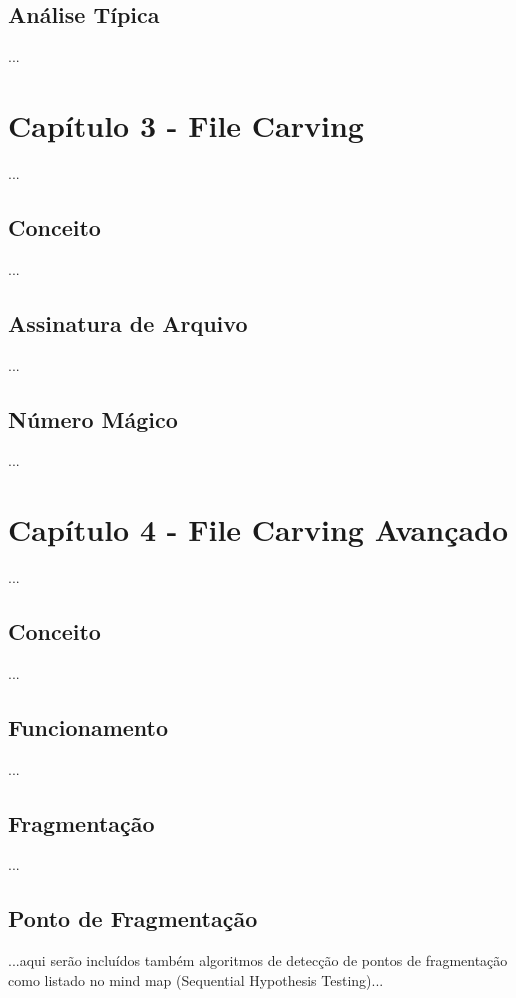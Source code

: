 \section{Análise Típica}
...

\chapter{Capítulo 3 - File Carving}
...

\section{Conceito}
...

\section{Assinatura de Arquivo}
...

\section{Número Mágico}
...

\chapter{Capítulo 4 - File Carving Avançado}
...

\section{Conceito}
...

\section{Funcionamento}
...

\section{Fragmentação}
...

\section{Ponto de Fragmentação}
...aqui serão incluídos também algoritmos de detecção de pontos de fragmentação como listado no mind map (Sequential Hypothesis Testing)...


